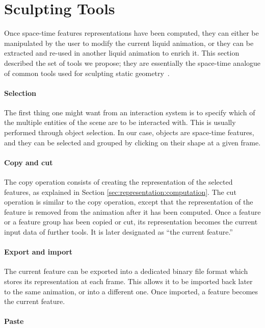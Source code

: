 \section{Sculpting Tools}
\label{sec:manipulation}
Once space-time features representations have been computed, they can either be manipulated by the user to modify the current liquid animation, or they can be extracted and re-used in another liquid animation to enrich it.
This section described the set of tools we propose; they are essentially the space-time analogue of common tools used for sculpting static geometry~\cite{Ferley2000,schmidt2010meshmixer,Takayama2011}.

\paragraph{Selection}

The first thing one might want from an interaction system is to specify which of the multiple entities of the scene are to be interacted with.
This is usually performed through object selection.
In our case, objects are space-time features, and they can be selected and grouped by clicking on their shape at a given frame.

\paragraph{Copy and cut}

The copy operation consists of creating the representation of the selected features, as explained in Section \ref{sec:representation:computation}.
The cut operation is similar to the copy operation, except that the representation of the feature is removed from the animation after it has been computed. 
Once a feature or a feature group has been copied or cut, its representation becomes the current input data of further tools.
It is later designated as ``the current feature.''

\paragraph{Export and import}

The current feature can be exported into a dedicated binary file format which stores its representation at each frame.
This allows it to be imported back later to the same animation, or into a different one.
Once imported, a feature becomes the current feature.

\paragraph{Paste}

